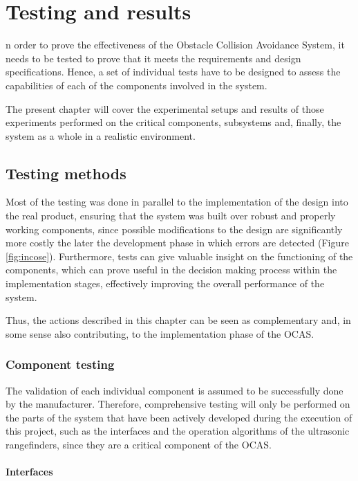 
\let\textcircled=\pgftextcircled
\chapter{Testing and results} \label{chapter:testing}

n order to prove the effectiveness of the Obstacle Collision Avoidance System, it needs to be tested to prove that it meets the requirements and design specifications.
Hence, a set of individual tests have to be designed to assess the capabilities of each of the components involved in the system.

The present chapter will cover the experimental setups and results of those experiments performed on the critical components, subsystems and, finally, the system as a whole in a realistic environment.


\section{Testing methods}

Most of the testing was done in parallel to the implementation of the design into the real product, ensuring that the system was built over robust and properly working components, since possible modifications to the design are significantly more costly the later the development phase in which errors are detected (Figure \ref{fig:incose}).
Furthermore, tests can give valuable insight on the functioning of the components, which can prove useful in the decision making process within the implementation stages, effectively improving the overall performance of the system.

Thus, the actions described in this chapter can be seen as complementary and, in some sense also contributing, to the implementation phase of the OCAS.

\subsection{Component testing}

The validation of each individual component is assumed to be successfully done by the manufacturer.
Therefore, comprehensive testing will only be performed on the parts of the system that have been actively developed during the execution of this project, such as the interfaces and the operation algorithms of the ultrasonic rangefinders, since they are a critical component of the OCAS.

\subsubsection{Interfaces}

